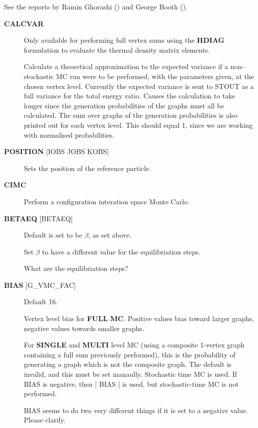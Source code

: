 \documentclass[openany,a4paper,10pt]{manual}
\begin{document}
See the reports by Ramin Ghorashi (\cite{RGPtIII}) and George Booth
(\cite{GHBCPGS}).
\begin{description}
\item[\textbf{CALCVAR}]
Only available for performing full vertex sums using the \textbf{HDIAG}
formulation to evaluate the thermal density matrix elements.

Calculate a theoretical approximation to the expected variance if a
non-stochastic MC run were to be performed, with the parameters given,
at the chosen vertex level.  Currently the expected variance is sent
to STOUT as a full variance for the total energy ratio.  Causes the
calculation to take longer since the generation probabilities of
the graphs must all be calculated.  The sum over graphs of the
generation probabilities is also printed out for each vertex
level. This should equal 1, since we are working with normalised
probabilities.

\item[\textbf{POSITION} {[}IOBS JOBS KOBS{]}]
Sets the position of the reference particle.

\item[\textbf{CIMC}]
Perform a configuration interation space Monte Carlo.

\item[\textbf{BETAEQ} {[}BETAEQ{]}]
Default is set to be $\beta$, as set above.

Set $\beta$ to have a different value for the equilibriation steps.

\begin{notice}[note]
What are the equilibriation steps?
\end{notice}

\item[\textbf{BIAS} {[}G\_VMC\_FAC{]}]
Default 16.

Vertex level bias for \textbf{FULL} \textbf{MC}. Positive values bias toward
larger graphs, negative values towards smaller graphs.

For \textbf{SINGLE} and \textbf{MULTI} level MC (using a composite 1-vertex
graph containing a full sum previously performed), this is the
probability of generating a graph which is not the composite graph.
The default is invalid, and this must be set manaully.  Stochastic
time MC is used.  If BIAS is negative, then | BIAS | is used, but
stochastic-time MC is not performed.

\begin{notice}[note]
BIAS seems to do two very different things if it is set to a negative value.
Please clarify.
\end{notice}


\end{description}
\end{document}
